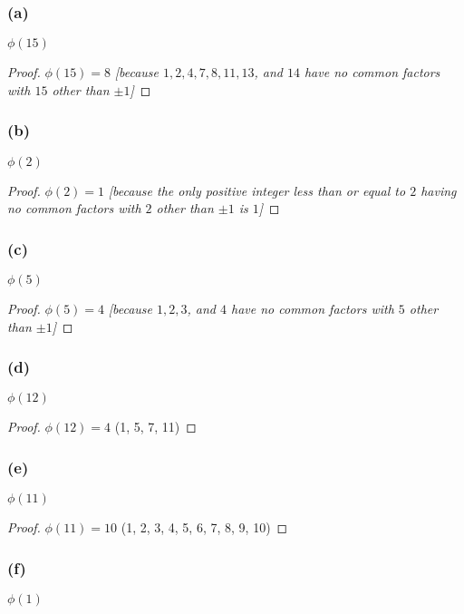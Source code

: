 \documentclass[14pt]{extarticle}
\begin{document}
\subsubsection{(a)}
\(\phi(15)\)

\begin{proof}
    \(\phi(15) = 8\) {\it [because $1, 2, 4, 7, 8, 11, 13$, and $14$ have no common factors with $15$ other than $\pm 1$]}
\end{proof}

\subsubsection{(b)}
\(\phi(2)\)

\begin{proof}
    \(\phi(2) = 1\) {\it [because the only positive integer less than or equal to $2$ having no common factors with $2$
                other than $\pm 1$ is $1$]}
\end{proof}

\subsubsection{(c)}
\(\phi(5)\)

\begin{proof}
    \(\phi(5) = 4\) {\it [because $1, 2, 3$, and $4$ have no common factors with $5$ other than $\pm 1$]}
\end{proof}

\subsubsection{(d)}
\(\phi(12)\)

\begin{proof}
    \(\phi(12) = 4\) (1, 5, 7, 11)
\end{proof}

\subsubsection{(e)}
\(\phi(11)\)

\begin{proof}
    \(\phi(11) = 10\) (1, 2, 3, 4, 5, 6, 7, 8, 9, 10)
\end{proof}

\subsubsection{(f)}
\(\phi(1)\)
\end{document}
